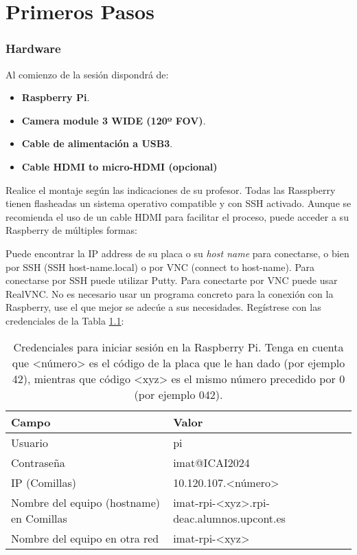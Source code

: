 \chapter{\textbf{Primeros Pasos}}
\label{chapter:primeros_pasos}

\subsection*{Hardware}
{}
\vspace{5mm}

Al comienzo de la sesión dispondrá de:

\begin{itemize}
    \item \textbf{Raspberry Pi}.
    \item \textbf{Camera module 3 WIDE (120º FOV)}.
    \item \textbf{Cable de alimentación a USB3}.
    \item \textbf{Cable HDMI to micro-HDMI (opcional)}
\end{itemize}

Realice el montaje según las indicaciones de su profesor. Todas las Rasspberry tienen flasheadas un sistema operativo compatible y con SSH activado. Aunque se recomienda el uso de un cable HDMI para facilitar el proceso, puede acceder a su Raspberry de múltiples formas:

Puede encontrar la IP address de su placa o su \textit{host name} para conectarse, o bien por SSH (SSH host-name.local) o por VNC (connect to host-name). Para conectarse por SSH puede utilizar Putty. Para conectarte por VNC puede usar RealVNC. No es necesario usar un programa concreto para la conexión con la Raspberry, use el que mejor se adecúe a sus necesidades. Regístrese con las credenciales de la Tabla \ref{table:credenciales}:

\begin{table}[h!]
    \centering
    \begin{tabular}{|l|l|}
    \hline
    \textbf{Campo} & \textbf{Valor}\\
    \hline
    Usuario & pi \\
    \hline
    Contraseña & imat@ICAI2024 \\
    \hline
    IP (Comillas) & 10.120.107.<número> \\
    \hline
    Nombre del equipo (hostname) en Comillas & imat-rpi-<xyz>.rpi-deac.alumnos.upcont.es \\
    \hline
    Nombre del equipo en otra red & imat-rpi-<xyz> \\
    \hline
    \end{tabular}
    \caption{Credenciales para iniciar sesión en la Raspberry Pi. Tenga en cuenta que <número> es el código de la placa que le han dado (por ejemplo 42), mientras que código <xyz> es el mismo número precedido por 0 (por ejemplo 042).}
    \label{table:credenciales}
\end{table}

